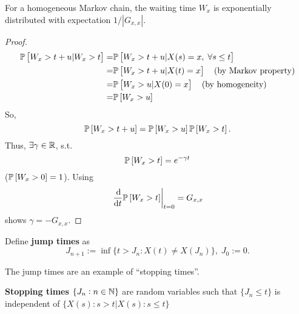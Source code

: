 \begin{proposition}
    For a homogeneous Markov chain, the waiting time $W_x$ is exponentially distributed with expectation $1 / |G_{x,x}|$.
\end{proposition}
\begin{proof}
    \begin{align*}
        \mathbb{P} \left[ W_x > t+u | W_x > t \right] = & \mathbb{P} \left[ W_x > t + u | X(s) = x, \; \forall s \le t \right]\\ 
        = & \mathbb{P} \left[ W_x > t+u | X(t) = x \right] \quad \text{(by Markov property)} \\ 
        = & \mathbb{P} \left[ W_x > u | X(0) = x \right] \quad \text{(by homogeneity)} \\ 
        = & \mathbb{P} \left[ W_x > u \right]
    \end{align*}
    So, 
    \begin{equation*}
        \mathbb{P} \left[ W_x > t+u \right] = \mathbb{P} \left[ W_x > u \right] \mathbb{P} \left[ W_x > t \right].
    \end{equation*}
    Thus, $\exists \gamma \in \mathbb{R}$, s.t. 
    \begin{equation*}
        \mathbb{P} \left[ W_x > t \right] = e^{-\gamma t}
    \end{equation*}
    ($\mathbb{P} \left[ W_x > 0 \right] = 1$). Using
    \begin{equation*}
        \left. \frac{\dif}{\dif t} \prob \left[ W_x > t \right] \right|_{t = 0} = G_{x,x}
    \end{equation*}
    shows $\gamma = - G_{x, x}$.
\end{proof}

\begin{definition}
    Define \textbf{jump times} as 
    \begin{equation*}
        J_{n+1} := \inf \{ t > J_n : X(t) \neq X(J_n) \}, \; J_0 := 0.
    \end{equation*}
\end{definition}
\begin{remark}
    The jump times are an example of ``stopping times''.
\end{remark}

\begin{definition}
    \textbf{Stopping times} $\{J_n : n \in \mathbb{N}\}$ are random variables such that $\{ J_n \le t \}$ is independent of $\{ X(s) : s > t | X(s) : s \le t\}$
\end{definition}

